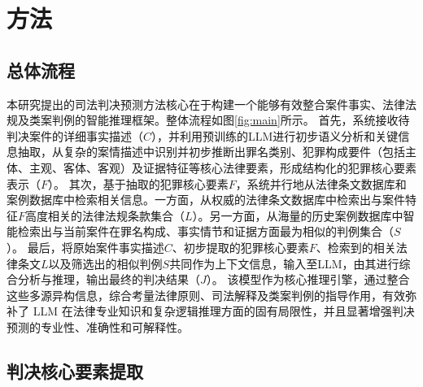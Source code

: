 

\section{\heiti 方法}
\subsection{\heiti 总体流程}

本研究提出的司法判决预测方法核心在于构建一个能够有效整合案件事实、法律法规及类案判例的智能推理框架。整体流程如图\ref{fig:main}所示。
首先，系统接收待判决案件的详细事实描述（$C$），并利用预训练的LLM进行初步语义分析和关键信息抽取，从复杂的案情描述中识别并初步推断出罪名类别、犯罪构成要件（包括主体、主观、客体、客观）及证据特征等核心法律要素，形成结构化的犯罪核心要素表示（$F$）。
其次，基于抽取的犯罪核心要素$F$，系统并行地从法律条文数据库和案例数据库中检索相关信息。一方面，从权威的法律条文数据库中检索出与案件特征$F$高度相关的法律法规条款集合（$L$）。另一方面，从海量的历史案例数据库中智能检索出与当前案件在罪名构成、事实情节和证据方面最为相似的判例集合（$S$）。
最后，将原始案件事实描述$C$、初步提取的犯罪核心要素$F$、检索到的相关法律条文$L$以及筛选出的相似判例$S$共同作为上下文信息，输入至LLM，由其进行综合分析与推理，输出最终的判决结果（$J$）。
该模型作为核心推理引擎，通过整合这些多源异构信息，综合考量法律原则、司法解释及类案判例的指导作用，有效弥补了 LLM 在法律专业知识和复杂逻辑推理方面的固有局限性，并且显著增强判决预测的专业性、准确性和可解释性。

\subsection{\heiti 判决核心要素提取}


